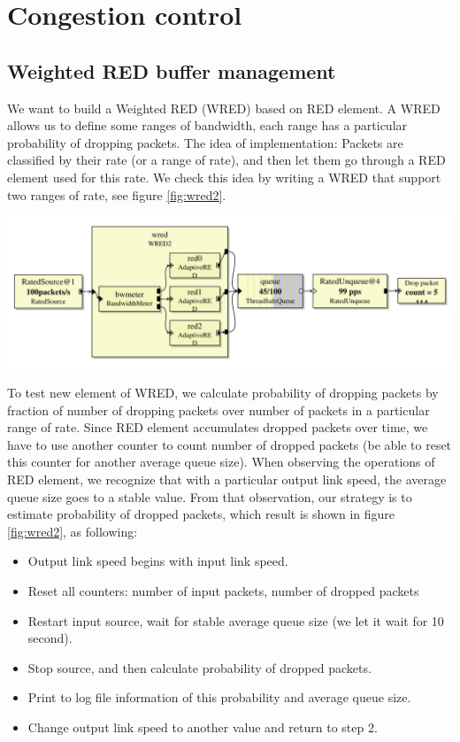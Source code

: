 \documentclass[a4paper]{article}
\begin{document}
  \section{Congestion control}
  \subsection{Weighted RED buffer management}
  We want to build a Weighted RED (WRED) based on RED element. A WRED allows us to define some ranges of bandwidth, each range has a particular probability of dropping packets. The idea of implementation: Packets are classified by their rate (or a range of rate), and then let them go through a RED element used for this rate. We check this idea by writing a WRED that support two ranges of rate, see figure \ref{fig:wred2}.
    \begin{center}
	  \includegraphics[scale=0.5]{wred2.pdf}
	  \label{fig:wred2}
    \end{center}
  To test new element of WRED, we calculate probability of dropping packets by fraction of number of dropping packets over number of packets in a particular range of rate. Since RED element accumulates dropped packets over time, we have to use another counter to count number of dropped packets (be able to reset this counter for another average queue size). When observing the operations of RED element, we recognize that with a particular output link speed, the average queue size goes to a stable value. From that observation, our strategy is to estimate probability of dropped packets, which result is shown in figure \ref{fig:wred2}, as following:
  \begin{itemize}
  	\item Output link speed begins with input link speed.
  	\item Reset all counters: number of input packets, number of dropped packets
  	\item Restart input source, wait for stable average queue size (we let it wait for 10 second).
  	\item Stop source, and then calculate probability of dropped packets.
  	\item Print to log file information of this probability and average queue size.
  	\item Change output link speed to another value and return to step 2.
  \end{itemize}
\end{document}
